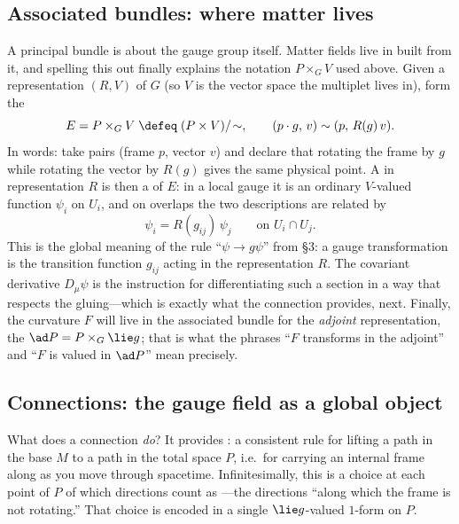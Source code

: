 \documentclass[11pt]{article}
\begin{document}
\subsection{Associated bundles: where matter lives}
\label{sec:associated}

A principal bundle is about the gauge group itself. Matter fields live in
 built from it, and spelling this out finally explains the
notation $P\times_G V$ used above. Given a representation $(R,V)$ of $G$ (so $V$ is the
vector space the multiplet lives in), form the 
\[
E=P\times_G V\;\defeq\;(P\times V)/\!\sim,\qquad (p\cdot g,\,v)\sim(p,\,R(g)\,v).
\]
In words: take pairs (frame $p$, vector $v$) and declare that rotating the frame by $g$
while rotating the vector by $R(g)$ gives the same physical point. A 
in representation $R$ is then a  of $E$: in a local gauge it is an ordinary
$V$-valued function $\psi_i$ on $U_i$, and on overlaps the two descriptions are related by
\[
\psi_i=R(g_{ij})\,\psi_j\qquad\text{on }U_i\cap U_j.
\]
This is the global meaning of the rule ``$\psi\to g\psi$'' from \S3: a gauge
transformation is the transition function $g_{ij}$ acting in the representation $R$. The
covariant derivative $D_\mu\psi$ is the instruction for differentiating such a section in
a way that respects the gluing---which is exactly what the connection provides, next.
Finally, the curvature $F$ will live in the associated bundle for the \emph{adjoint}
representation, the  $\ad P=P\times_G\lie g$; that is what the
phrases ``$F$ transforms in the adjoint'' and ``$F$ is valued in $\ad P$'' mean precisely.

\subsection{Connections: the gauge field as a global object}

What does a connection \emph{do}? It provides : a consistent
rule for lifting a path in the base $M$ to a path in the total space $P$, i.e.\ for
carrying an internal frame along as you move through spacetime. Infinitesimally, this is a
choice at each point of $P$ of which directions count as ---the
directions ``along which the frame is not rotating.'' That choice is encoded in a single
$\lie g$-valued $1$-form on $P$.
\end{document}
